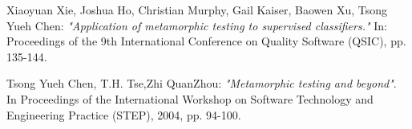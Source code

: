 \begin{thebibliography}{99}
Xiaoyuan Xie, Joshua Ho, Christian Murphy, Gail Kaiser, Baowen Xu, Tsong Yueh Chen:
{\it{ "Application of metamorphic testing to supervised classifiers."}} In: Proceedings of the 9th International Conference on Quality Software (QSIC), pp. 135-144.

Tsong Yueh Chen, T.H. Tse,Zhi QuanZhou: 
{\it{"Metamorphic testing and beyond"}}. In Proceedings of the International Workshop on Software Technology and Engineering Practice (STEP), 2004, pp. 94-100.

\end{thebibliography}
